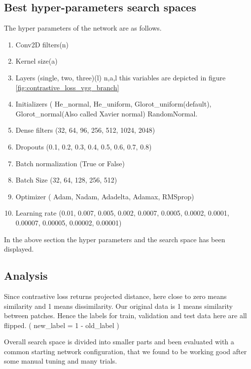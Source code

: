 \subsection{Best hyper-parameters search spaces}
 The hyper parameters of the network are as follows.
  \begin{enumerate}
   \item Conv2D filters(n) 
   \item Kernel size(a)
   \item Layers (single, two, three)(l) n,a,l this variables are depicted in figure \ref{fig:contrastive_loss_vgg_branch}
   \item Initializers ( He\_normal, He\_uniform, Glorot\_uniform(default), Glorot\_normal(Also called Xavier normal) RandomNormal.    
   \item Dense filters (32, 64, 96, 256, 512, 1024, 2048)
   \item Dropouts (0.1, 0.2, 0.3, 0.4, 0.5, 0.6, 0.7, 0.8)
   \item Batch normalization (True or False)
   \item Batch Size (32, 64, 128, 256, 512)
   \item Optimizer ( Adam, Nadam, Adadelta, Adamax, RMSprop)
   \item Learning rate (0.01, 0.007, 0.005, 0.002, 0.0007, 0.0005, 0.0002, 0.0001, 0.00007, 0.00005, 0.00002, 0.00001)   
  \end{enumerate}

In the above section the hyper parameters and the search space has been displayed.
  
\subsection{Analysis}
Since contrastive loss returns projected distance, here close to zero means similarity and 1 means dissimilarity. Our original data is 1 means similarity between patches.
Hence the labels for train, validation and test data here are all flipped. ( new\_label = 1 - old\_label )

Overall search space is divided into smaller parts and been evaluated with a common starting network configuration, that we found to be working good after some manual tuning and many trials.

